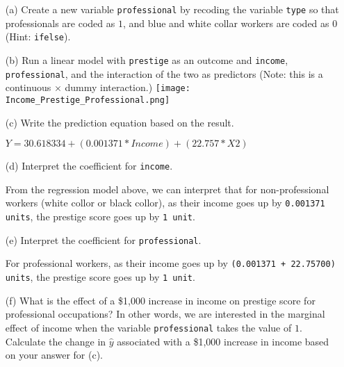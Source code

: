 \documentclass[12pt,letterpaper]{article}
\begin{document}
\newpage
\begin{enumerate}
	
	\item [(a)]
	Create a new variable \texttt{professional} by recoding the variable \texttt{type} so that professionals are coded as $1$, and blue and white collar workers are coded as $0$ (Hint: \texttt{ifelse}).
	
		 
	\vspace{1 cm}
	
	
	\item [(b)]
	Run a linear model with \texttt{prestige} as an outcome and \texttt{income}, \texttt{professional}, and the interaction of the two as predictors (Note: this is a continuous $\times$ dummy interaction.)
		\texttt{[image: Income\_Prestige\_Professional.png]}
		 
	\vspace{1cm}
	\item [(c)]
	Write the prediction equation based on the result.
	
\( Y=30.618334+(0.001371*Income)+(22.757*X2) \)
\newpage
	\item [(d)]
	Interpret the coefficient for \texttt{income}.
		
		From the regression model above, we can interpret that for non-professional workers (white collor or black collor), as their income goes up by  \texttt{0.001371 units}, the prestige score goes up by \texttt{1 unit}.
		

	\vspace{1cm}	
	\item [(e)]
	Interpret the coefficient for \texttt{professional}.
		
				For professional workers, as their income goes up by \texttt{(0.001371 + 22.75700) units}, the prestige score goes up by \texttt{1 unit}.
	
	\newpage
	\item [(f)]
	What is the effect of a \$1,000 increase in income on prestige score for professional occupations? In other words, we are interested in the marginal effect of income when the variable \texttt{professional} takes the value of $1$. Calculate the change in $\hat{y}$ associated with a \$1,000 increase in income based on your answer for (c).
		\vspace{.5cm}
	

\end{enumerate}
\end{document}
